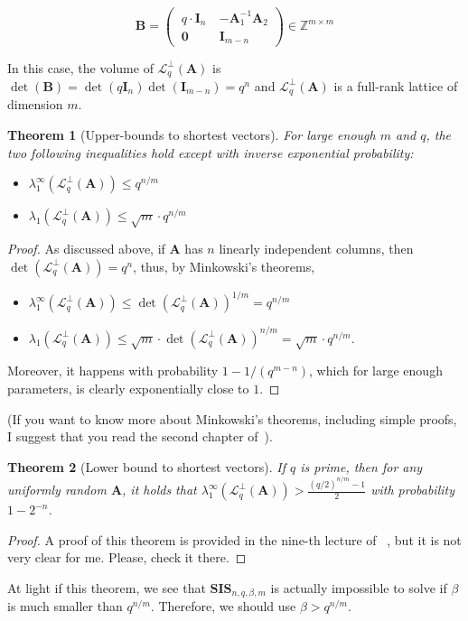 \documentclass[a4paper,11pt]{article}
\let\vec\mathbf %
\newcommand\Z{{\mathbb Z}}
\newcommand\A{{\mathbf A}}
\newcommand\LqA{\mathcal{L}_q^{\bot}\left(\A\right)}
\newcommand\SIS{\textbf{SIS}_{n, q, \beta, m}}
\newtheorem{theorem}{Theorem}[section]
\theoremstyle{definition}
\theoremstyle{remark}
\begin{document}
$$
\vec{B} =
    \begin{pmatrix}
    ~q\cdot\vec{I}_n~  & -\A_1^{-1}\A_2 \\
    ~\vec 0~  & \vec{I}_{m-n}
    \end{pmatrix} \in \Z^{m \times m}
$$

In this case, the volume of $\LqA$ is $\det(\vec B) = \det(q\vec{I}_n)
\det({\vec I}_{m-n}) = q^n$ and $\LqA$ is a full-rank lattice of dimension $m$.

\begin{theorem}[Upper-bounds to shortest vectors]
For large enough $m$ and $q$, the two following inequalities hold except with
inverse exponential probability:
\begin{itemize}
\item $\lambda_1^{\infty}(\LqA) \le q^{n/m}$
\item $\lambda_1(\LqA) \le \sqrt{m}\cdot q^{n/m}$
\end{itemize}
\end{theorem}
\begin{proof}
As discussed above, if $\A$ has $n$ linearly independent columns, then
$\det(\LqA) = q^n$, thus, by Minkowski's theorems,
\begin{itemize}
\item $\lambda_1^{\infty}(\LqA) \le \det(\LqA)^{1/m} = q^{n/m}$
\item $\lambda_1(\LqA) \le \sqrt{m}\cdot \det(\LqA)^{n/m} = \sqrt{m}\cdot
q^{n/m}$.
\end{itemize}

Moreover, it happens with probability $1- 1/(q^{m-n})$, which for large enough
parameters, is clearly exponentially close to $1$.
\end{proof}

(If you want to know more about Minkowski's theorems, including simple proofs,
I suggest that you read the second chapter of~\cite{mic14}).

\begin{theorem}[Lower bound to shortest vectors]
If $q$ is prime, then for any uniformly random $\A$, it holds that
$\lambda_1^{\infty}(\LqA) > \frac{(q/2)^{n/m} -1}{2}$ with probability $1 -
2^{-n}$.
\end{theorem}
\begin{proof}
A proof of this theorem is provided in the nine-th lecture of ~\cite{dd18}, but
it is not very clear for me. Please, check it there.
\end{proof}

At light if this theorem, we see that  $\SIS$ is actually impossible to solve if
$\beta$ is much smaller than $q^{n/m}$. Therefore, we should use $\beta >
q^{n/m}$.
\end{document}
